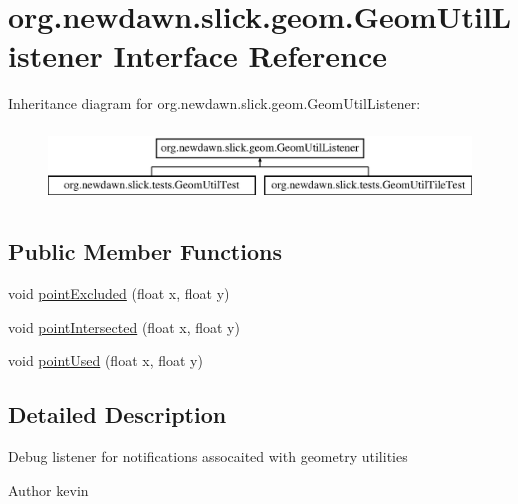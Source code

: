 \hypertarget{interfaceorg_1_1newdawn_1_1slick_1_1geom_1_1_geom_util_listener}{}\section{org.\+newdawn.\+slick.\+geom.\+Geom\+Util\+Listener Interface Reference}
\label{interfaceorg_1_1newdawn_1_1slick_1_1geom_1_1_geom_util_listener}
Inheritance diagram for org.\+newdawn.\+slick.\+geom.\+Geom\+Util\+Listener\+:\begin{figure}[H]
\begin{center}
\leavevmode
\includegraphics[height=2.000000cm]{interfaceorg_1_1newdawn_1_1slick_1_1geom_1_1_geom_util_listener}
\end{center}
\end{figure}
\subsection*{Public Member Functions}
\begin{DoxyCompactItemize}
\item 
void \mbox{\hyperlink{interfaceorg_1_1newdawn_1_1slick_1_1geom_1_1_geom_util_listener_ab800520173f64c032206777411644b4c}{point\+Excluded}} (float x, float y)
\item 
void \mbox{\hyperlink{interfaceorg_1_1newdawn_1_1slick_1_1geom_1_1_geom_util_listener_aac2e6eb21b135b8af600cbd2fa0b1402}{point\+Intersected}} (float x, float y)
\item 
void \mbox{\hyperlink{interfaceorg_1_1newdawn_1_1slick_1_1geom_1_1_geom_util_listener_a73777bd9904d9472db523c10d644db0a}{point\+Used}} (float x, float y)
\end{DoxyCompactItemize}


\subsection{Detailed Description}
Debug listener for notifications assocaited with geometry utilities

\begin{DoxyAuthor}{Author}
kevin 
\end{DoxyAuthor}


